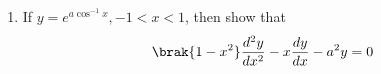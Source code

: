 \begin{enumerate}
\item If $y=e^{a \cos^{-1}x}, -1<x<1$, then show that
\begin{align}	
	\brak{1-x^2}\frac{d^2y}{dx^2}-x\frac{dy}{dx}-a^2y=0
\end{align}
\end{enumerate}

